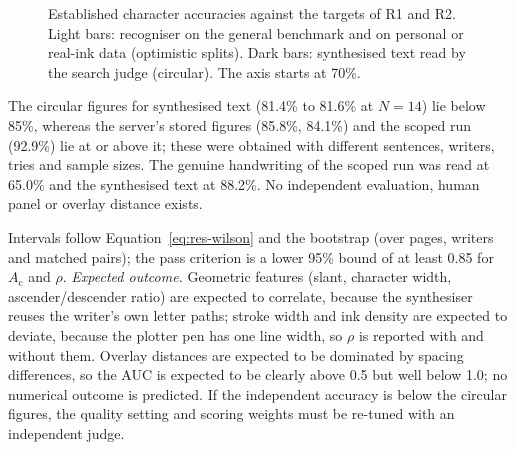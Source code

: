 \begin{figure}[h]
\centering
{}
\caption{Established character accuracies against the targets of R1 and R2. Light bars: recogniser on the general benchmark and on personal or real-ink data (optimistic splits). Dark bars: synthesised text read by the search judge (circular). The axis starts at 70\%.}
\label{fig:res-bars}
\end{figure}


            The circular figures for synthesised text (81.4\% to 81.6\% at $N=14$) lie below 85\%, whereas the server's stored figures (85.8\%, 84.1\%) and the scoped run (92.9\%) lie at or above it; these were obtained with different sentences, writers, tries and sample sizes.
            The genuine handwriting of the scoped run was read at 65.0\% and the synthesised text at 88.2\%.
            No independent evaluation, human panel or overlay distance exists.


            Intervals follow Equation~\ref{eq:res-wilson} and the bootstrap (over pages, writers and matched pairs); the pass criterion is a lower 95\% bound of at least 0.85 for $A_{\mathrm{c}}$ and $\rho$.
            \emph{Expected outcome.}
            Geometric features (slant, character width, ascender/descender ratio) are expected to correlate, because the synthesiser reuses the writer's own letter paths; stroke width and ink density are expected to deviate, because the plotter pen has one line width, so $\rho$ is reported with and without them.
            Overlay distances are expected to be dominated by spacing differences, so the AUC is expected to be clearly above 0.5 but well below 1.0; no numerical outcome is predicted.
            If the independent accuracy is below the circular figures, the quality setting and scoring weights must be re-tuned with an independent judge.

